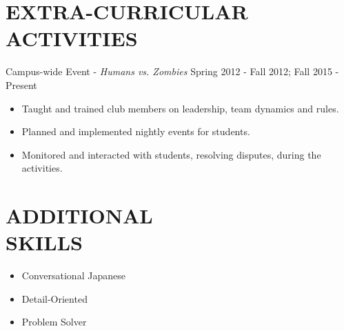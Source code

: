 \documentclass[margin, 10pt]{res} %
\begin{document}
\begin{resume}

\section{EXTRA-CURRICULAR \\ ACTIVITIES}

Campus-wide Event - {\sl Humans vs. Zombies} \hfill Spring 2012 - Fall 2012; Fall 2015 - Present
\begin{itemize} \itemsep -2pt
  \item Taught and trained club members on leadership, team dynamics and rules.
  \item Planned and implemented nightly events for students.
  \item Monitored and interacted with students, resolving disputes, during the activities.
\end{itemize}


\section{ADDITIONAL \\ SKILLS}

\begin{multicols}{3}
  \begin{itemize}
    \item Conversational Japanese
    \item Detail-Oriented
    \item Problem Solver
  \end{itemize}
\end{multicols}



\end{resume}
\end{document}
